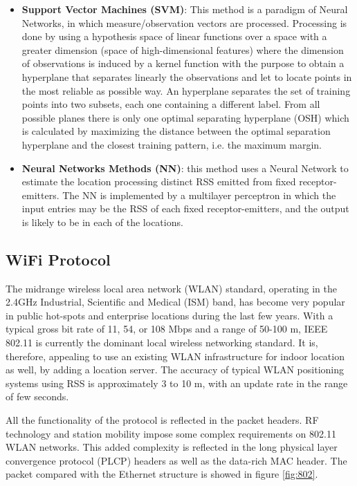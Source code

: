 \begin{itemize}
\item \textbf{Support Vector Machines (SVM)}: This method is a paradigm of Neural Networks, in which measure/observation vectors are processed. Processing is done by using a hypothesis space of linear functions over a space with a greater dimension (space of high-dimensional features) where the dimension of observations is induced by a kernel function with the purpose to obtain a hyperplane that separates linearly the observations and let to locate points in the most reliable as possible way. An hyperplane separates the set of training points into two subsets, each one containing a different label. From all possible planes there is only one optimal separating hyperplane (OSH) which is calculated by maximizing the distance between the optimal separation hyperplane and the closest training pattern, i.e. the maximum margin.

\item \textbf{Neural Networks Methods (NN)}: this method uses a Neural Network to estimate the location processing distinct RSS emitted from fixed receptor-emitters. The NN is implemented by a multilayer perceptron in which the input entries may be the RSS of each fixed receptor-emitters, and the output is likely to be in each of the locations.

\end{itemize}


\subsection{WiFi Protocol}
The midrange wireless local area network (WLAN) standard, operating in the 2.4GHz Industrial, Scientific and Medical (ISM) band, has become very popular in public hot-spots and enterprise locations during the last few years. With a typical gross bit rate of 11, 54, or 108 Mbps and a range of 50-100 m, IEEE 802.11 is currently the dominant local wireless networking standard. It is, therefore, appealing to use an existing WLAN infrastructure for indoor location as well, by adding a location server. The accuracy of typical WLAN positioning systems using RSS is approximately 3 to 10 m, with an update rate in the range of few seconds.

All the functionality of the protocol is reflected in the packet headers. RF technology and station mobility impose some complex requirements on 802.11 WLAN networks. This added complexity is reflected in the long physical layer convergence protocol (PLCP) headers as well as the data-rich MAC header. The packet compared with the Ethernet structure is showed in figure \ref{fig:802}.

